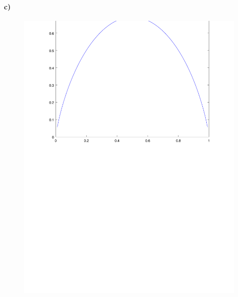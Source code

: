 \documentclass{scrartcl}
\begin{document}
\paragraph{c)}
\begin{figure}
    \centering
    \includegraphics[width=\textwidth]{PlotA2c.pdf}
\end{figure}
\end{document}
